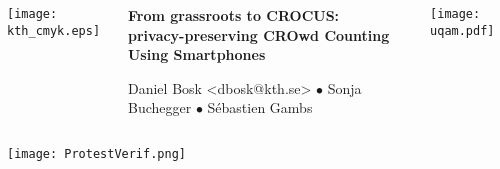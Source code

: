 \begin{columns}
  \begin{column}{0.17\linewidth}
    \texttt{[image: kth\_cmyk.eps]}
    \hfill
  \end{column}
  \hfill
  \begin{column}{0.64\linewidth}
    \begin{center}
      \Huge\bfseries
      From grassroots to CROCUS:\\[-0.25em]
      privacy-preserving CROwd Counting Using Smartphones
    \end{center}
    \vspace{0.25em}
    \begin{center}
      \large
      Daniel Bosk <dbosk@kth.se>
      $\bullet$
      Sonja Buchegger
      $\bullet$
      Sébastien Gambs
    \end{center}
    \vspace{1.5em}
  \end{column}
  \hfill
  \begin{column}{0.17\linewidth}
    \hfill
    \texttt{[image: uqam.pdf]}
  \end{column}
\end{columns}

\vfill

\texttt{[image: ProtestVerif.png]}

\vfill

